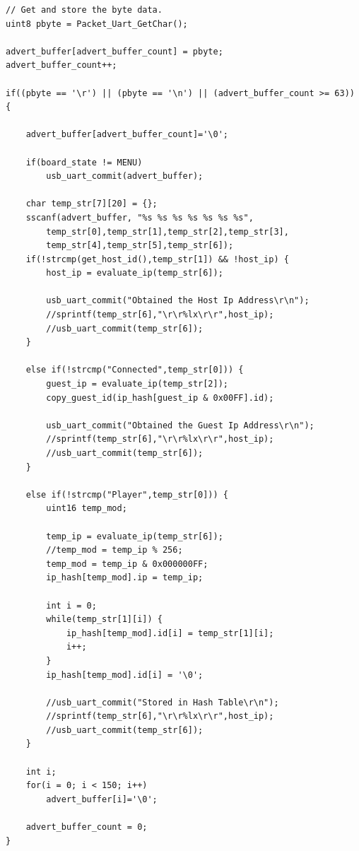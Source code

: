 \documentclass[a4paper, 12pt]{article}
\begin{document}
    \begin{verbatim}
// Get and store the byte data.
uint8 pbyte = Packet_Uart_GetChar();
    
advert_buffer[advert_buffer_count] = pbyte;
advert_buffer_count++;

if((pbyte == '\r') || (pbyte == '\n') || (advert_buffer_count >= 63)) {
    
    advert_buffer[advert_buffer_count]='\0';
    
    if(board_state != MENU)
        usb_uart_commit(advert_buffer);
    
    char temp_str[7][20] = {};
    sscanf(advert_buffer, "%s %s %s %s %s %s %s",
        temp_str[0],temp_str[1],temp_str[2],temp_str[3],
        temp_str[4],temp_str[5],temp_str[6]);
    if(!strcmp(get_host_id(),temp_str[1]) && !host_ip) {
        host_ip = evaluate_ip(temp_str[6]);
        
        usb_uart_commit("Obtained the Host Ip Address\r\n");
        //sprintf(temp_str[6],"\r\r%lx\r\r",host_ip);
        //usb_uart_commit(temp_str[6]);
    }
    
    else if(!strcmp("Connected",temp_str[0])) {
        guest_ip = evaluate_ip(temp_str[2]);
        copy_guest_id(ip_hash[guest_ip & 0x00FF].id);
        
        usb_uart_commit("Obtained the Guest Ip Address\r\n");
        //sprintf(temp_str[6],"\r\r%lx\r\r",host_ip);
        //usb_uart_commit(temp_str[6]);
    }
    
    else if(!strcmp("Player",temp_str[0])) {        
        uint16 temp_mod;
        
        temp_ip = evaluate_ip(temp_str[6]);
        //temp_mod = temp_ip % 256;
        temp_mod = temp_ip & 0x000000FF;
        ip_hash[temp_mod].ip = temp_ip;
        
        int i = 0;
        while(temp_str[1][i]) {
            ip_hash[temp_mod].id[i] = temp_str[1][i];
            i++;
        }
        ip_hash[temp_mod].id[i] = '\0';
        
        //usb_uart_commit("Stored in Hash Table\r\n");
        //sprintf(temp_str[6],"\r\r%lx\r\r",host_ip);
        //usb_uart_commit(temp_str[6]);
    }
    
    int i;
    for(i = 0; i < 150; i++)
        advert_buffer[i]='\0';
        
    advert_buffer_count = 0;
}
    \end{verbatim}
\end{document}
